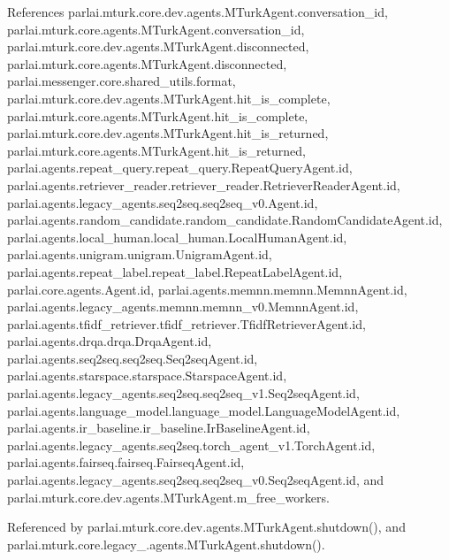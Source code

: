 References parlai.\+mturk.\+core.\+dev.\+agents.\+M\+Turk\+Agent.\+conversation\+\_\+id, parlai.\+mturk.\+core.\+agents.\+M\+Turk\+Agent.\+conversation\+\_\+id, parlai.\+mturk.\+core.\+dev.\+agents.\+M\+Turk\+Agent.\+disconnected, parlai.\+mturk.\+core.\+agents.\+M\+Turk\+Agent.\+disconnected, parlai.\+messenger.\+core.\+shared\+\_\+utils.\+format, parlai.\+mturk.\+core.\+dev.\+agents.\+M\+Turk\+Agent.\+hit\+\_\+is\+\_\+complete, parlai.\+mturk.\+core.\+agents.\+M\+Turk\+Agent.\+hit\+\_\+is\+\_\+complete, parlai.\+mturk.\+core.\+dev.\+agents.\+M\+Turk\+Agent.\+hit\+\_\+is\+\_\+returned, parlai.\+mturk.\+core.\+agents.\+M\+Turk\+Agent.\+hit\+\_\+is\+\_\+returned, parlai.\+agents.\+repeat\+\_\+query.\+repeat\+\_\+query.\+Repeat\+Query\+Agent.\+id, parlai.\+agents.\+retriever\+\_\+reader.\+retriever\+\_\+reader.\+Retriever\+Reader\+Agent.\+id, parlai.\+agents.\+legacy\+\_\+agents.\+seq2seq.\+seq2seq\+\_\+v0.\+Agent.\+id, parlai.\+agents.\+random\+\_\+candidate.\+random\+\_\+candidate.\+Random\+Candidate\+Agent.\+id, parlai.\+agents.\+local\+\_\+human.\+local\+\_\+human.\+Local\+Human\+Agent.\+id, parlai.\+agents.\+unigram.\+unigram.\+Unigram\+Agent.\+id, parlai.\+agents.\+repeat\+\_\+label.\+repeat\+\_\+label.\+Repeat\+Label\+Agent.\+id, parlai.\+core.\+agents.\+Agent.\+id, parlai.\+agents.\+memnn.\+memnn.\+Memnn\+Agent.\+id, parlai.\+agents.\+legacy\+\_\+agents.\+memnn.\+memnn\+\_\+v0.\+Memnn\+Agent.\+id, parlai.\+agents.\+tfidf\+\_\+retriever.\+tfidf\+\_\+retriever.\+Tfidf\+Retriever\+Agent.\+id, parlai.\+agents.\+drqa.\+drqa.\+Drqa\+Agent.\+id, parlai.\+agents.\+seq2seq.\+seq2seq.\+Seq2seq\+Agent.\+id, parlai.\+agents.\+starspace.\+starspace.\+Starspace\+Agent.\+id, parlai.\+agents.\+legacy\+\_\+agents.\+seq2seq.\+seq2seq\+\_\+v1.\+Seq2seq\+Agent.\+id, parlai.\+agents.\+language\+\_\+model.\+language\+\_\+model.\+Language\+Model\+Agent.\+id, parlai.\+agents.\+ir\+\_\+baseline.\+ir\+\_\+baseline.\+Ir\+Baseline\+Agent.\+id, parlai.\+agents.\+legacy\+\_\+agents.\+seq2seq.\+torch\+\_\+agent\+\_\+v1.\+Torch\+Agent.\+id, parlai.\+agents.\+fairseq.\+fairseq.\+Fairseq\+Agent.\+id, parlai.\+agents.\+legacy\+\_\+agents.\+seq2seq.\+seq2seq\+\_\+v0.\+Seq2seq\+Agent.\+id, and parlai.\+mturk.\+core.\+dev.\+agents.\+M\+Turk\+Agent.\+m\+\_\+free\+\_\+workers.



Referenced by parlai.\+mturk.\+core.\+dev.\+agents.\+M\+Turk\+Agent.\+shutdown(), and parlai.\+mturk.\+core.\+legacy\+\_.\+agents.\+M\+Turk\+Agent.\+shutdown().

